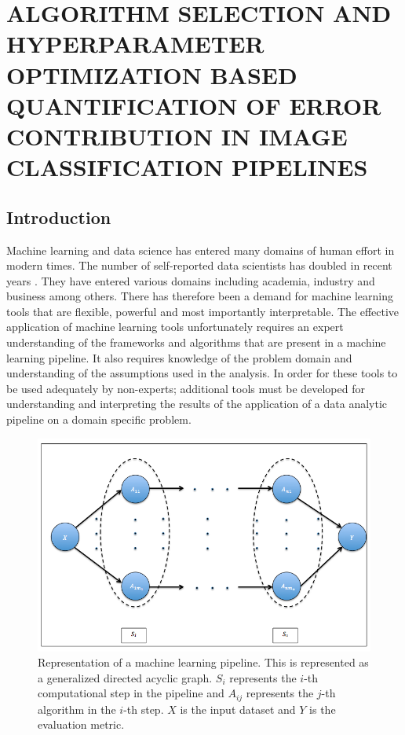 \chapter{ALGORITHM SELECTION AND HYPERPARAMETER OPTIMIZATION BASED QUANTIFICATION OF ERROR CONTRIBUTION IN IMAGE CLASSIFICATION PIPELINES}
\label{chap:EP}

\let\thefootnote\relax\footnotetext{}


\section{Introduction} 
\label{sec1}
Machine learning and data science has entered many domains of human effort in modern times. The number of self-reported data scientists has doubled in recent years \cite{harrison1995validity}. They have entered various domains including academia, industry and business among others. There has therefore been a demand for machine learning tools that are flexible, powerful and most importantly interpretable. The effective application of machine learning tools unfortunately requires an expert understanding of the frameworks and algorithms that are present in a machine learning pipeline. It also requires knowledge of the problem domain and understanding of the assumptions used in the analysis. In order for these tools to be used adequately by non-experts; additional tools must be developed for understanding and interpreting the results of the application of a data analytic pipeline on a domain specific problem.  

\begin{figure}[H]
    \centering
    \includegraphics[scale=0.5]{img/EP/generalized_pipeline}
    \caption{Representation of a machine learning pipeline. This is represented as a generalized directed acyclic graph. $S_i$ represents the $i$-th computational step in the pipeline and $A_{ij}$ represents the $j$-th algorithm in the $i$-th step. $X$ is the input dataset and $Y$ is the evaluation metric.}
    \label{fig:pipeline}
\end{figure}

